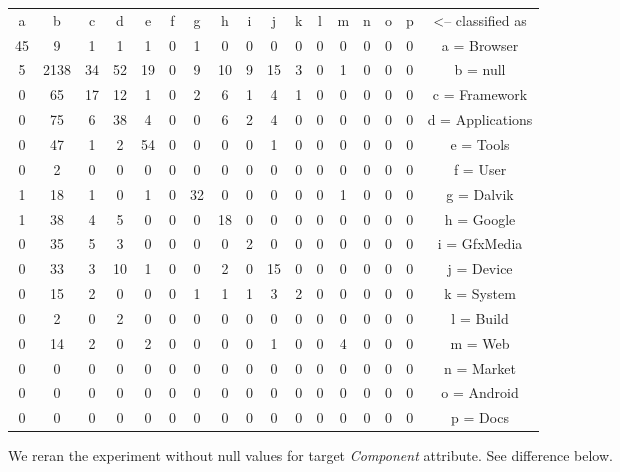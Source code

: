 \begin{tabular}{|c|c|c|c|c|c|c|c|c|c|c|c|c|c|c|c|c|}
a & b & c & d & e & f & g & h & i & j & k & l & m & n & o & p   &<-- classified as\\
45 & 9 & 1 & 1 & 1 & 0 & 1 & 0 & 0 & 0 & 0 & 0 & 0 & 0 & 0 & 0 &  a = Browser\\
5&2138 & 34 & 52 & 19 & 0 & 9 & 10 & 9 & 15 & 3 & 0 & 1 & 0 & 0 & 0 &  b = null\\
0 & 65 & 17 & 12 & 1 & 0 & 2 & 6 & 1 & 4 & 1 & 0 & 0 & 0 & 0 & 0 &  c = Framework\\
0 & 75 & 6 & 38 & 4 & 0 & 0 & 6 & 2 & 4 & 0 & 0 & 0 & 0 & 0 & 0 &  d = Applications\\
0 & 47 & 1 & 2 & 54 & 0 & 0 & 0 & 0 & 1 & 0 & 0 & 0 & 0 & 0 & 0 &  e = Tools\\
0 & 2 & 0 & 0 & 0 & 0 & 0 & 0 & 0 & 0 & 0 & 0 & 0 & 0 & 0 & 0 &  f = User\\
1 & 18 & 1 & 0 & 1 & 0 & 32 & 0 & 0 & 0 & 0 & 0 & 1 & 0 & 0 & 0 &  g = Dalvik\\
1 & 38 & 4 & 5 & 0 & 0 & 0 & 18 & 0 & 0 & 0 & 0 & 0 & 0 & 0 & 0 &  h = Google\\
0 & 35 & 5 & 3 & 0 & 0 & 0 & 0 & 2 & 0 & 0 & 0 & 0 & 0 & 0 & 0 &  i = GfxMedia\\
0 & 33 & 3 & 10 & 1 & 0 & 0 & 2 & 0 & 15 & 0 & 0 & 0 & 0 & 0 & 0 &  j = Device\\
0 & 15 & 2 & 0 & 0 & 0 & 1 & 1 & 1 & 3 & 2 & 0 & 0 & 0 & 0 & 0 &  k = System\\
0 & 2 & 0 & 2 & 0 & 0 & 0 & 0 & 0 & 0 & 0 & 0 & 0 & 0 & 0 & 0 &  l = Build\\
0 & 14 & 2 & 0 & 2 & 0 & 0 & 0 & 0 & 1 & 0 & 0 & 4 & 0 & 0 & 0 &  m = Web\\
0 & 0 & 0 & 0 & 0 & 0 & 0 & 0 & 0 & 0 & 0 & 0 & 0 & 0 & 0 & 0 &  n = Market\\
0 & 0 & 0 & 0 & 0 & 0 & 0 & 0 & 0 & 0 & 0 & 0 & 0 & 0 & 0 & 0 &  o = Android\\
0 & 0 & 0 & 0 & 0 & 0 & 0 & 0 & 0 & 0 & 0 & 0 & 0 & 0 & 0 & 0 &  p = Docs\\
\end{tabular}

We reran the experiment without null values for target {\it Component} attribute. See difference below.


